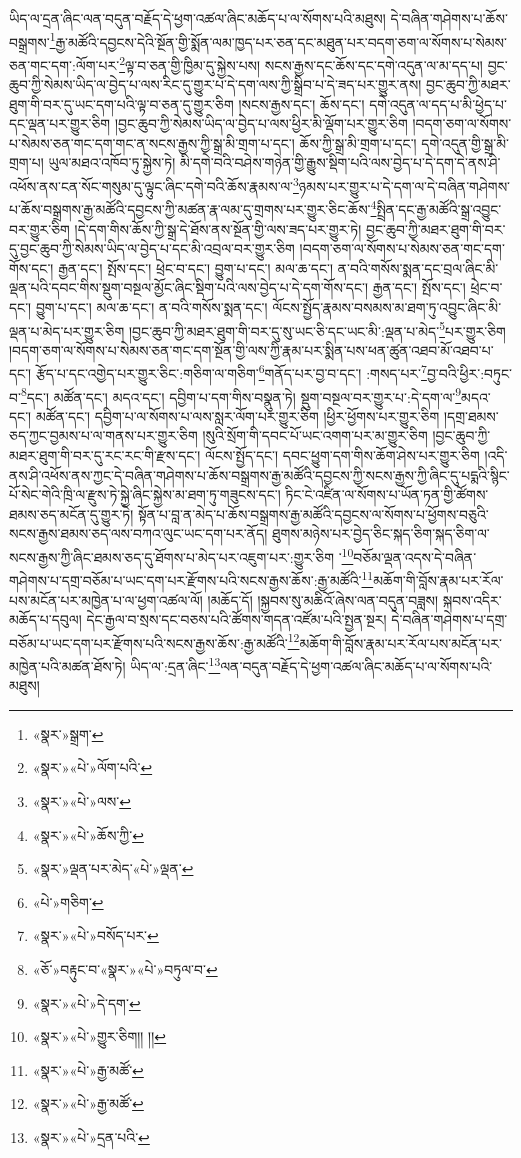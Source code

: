 ཡིད་ལ་དྲན་ཞིང་ལན་བདུན་བརྗོད་དེ་ཕྱག་འཚལ་ཞིང་མཆོད་པ་ལ་སོགས་པའི་མཐུས། དེ་བཞིན་གཤེགས་པ་ཆོས་བསྒྲགས་\footnote{«སྣར་»སྒྲག་}རྒྱ་མཚོའི་དབྱངས་དེའི་སྔོན་གྱི་སྨོན་ལམ་ཁྱད་པར་ཅན་དང་མཐུན་པར་བདག་ཅག་ལ་སོགས་པ་སེམས་ཅན་གང་དག་:ལོག་པར་\footnote{«སྣར་»«པེ་»ལོག་པའི་}ལྟ་བ་ཅན་གྱི་ཁྱིམ་དུ་སྐྱེས་པས། སངས་རྒྱས་དང་ཆོས་དང་དགེ་འདུན་ལ་མ་དད་པ། བྱང་ཆུབ་ཀྱི་སེམས་ཡིད་ལ་བྱེད་པ་ལས་རིང་དུ་གྱུར་པ་དེ་དག་ལས་ཀྱི་སྒྲིབ་པ་དེ་ཟད་པར་གྱུར་ནས། བྱང་ཆུབ་ཀྱི་མཐར་ཐུག་གི་བར་དུ་ཡང་དག་པའི་ལྟ་བ་ཅན་དུ་གྱུར་ཅིག །སངས་རྒྱས་དང་། ཆོས་དང་། དགེ་འདུན་ལ་དད་པ་མི་ཕྱེད་པ་དང་ལྡན་པར་གྱུར་ཅིག །བྱང་ཆུབ་ཀྱི་སེམས་ཡིད་ལ་བྱེད་པ་ལས་ཕྱིར་མི་ལྡོག་པར་གྱུར་ཅིག །བདག་ཅག་ལ་སོགས་པ་སེམས་ཅན་གང་དག་གང་ན་སངས་རྒྱས་ཀྱི་སྒྲ་མི་གྲག་པ་དང་། ཆོས་ཀྱི་སྒྲ་མི་གྲག་པ་དང་། དགེ་འདུན་གྱི་སྒྲ་མི་གྲག་པ། ཡུལ་མཐའ་འཁོབ་ཏུ་སྐྱེས་ཏེ། མི་དགེ་བའི་བཤེས་གཉེན་གྱི་རྒྱུས་སྡིག་པའི་ལས་བྱེད་པ་དེ་དག་དེ་ནས་ཤི་འཕོས་ནས་ངན་སོང་གསུམ་དུ་ལྟུང་ཞིང་དགེ་བའི་ཆོས་རྣམས་ལ་\footnote{«སྣར་»«པེ་»ལས་}ཉམས་པར་གྱུར་པ་དེ་དག་ལ་དེ་བཞིན་གཤེགས་པ་ཆོས་བསྒྲགས་རྒྱ་མཚོའི་དབྱངས་ཀྱི་མཚན་རྣ་ལམ་དུ་གྲགས་པར་གྱུར་ཅིང་ཆོས་\footnote{«སྣར་»«པེ་»ཆོས་ཀྱི་}སྤྲིན་དང་རྒྱ་མཚོའི་སྒྲ་འབྱུང་བར་གྱུར་ཅིག །དེ་དག་གིས་ཆོས་ཀྱི་སྒྲ་དེ་ཐོས་ནས་སྔོན་གྱི་ལས་ཟད་པར་གྱུར་ཏེ། བྱང་ཆུབ་ཀྱི་མཐར་ཐུག་གི་བར་དུ་བྱང་ཆུབ་ཀྱི་སེམས་ཡིད་ལ་བྱེད་པ་དང་མི་འབྲལ་བར་གྱུར་ཅིག །བདག་ཅག་ལ་སོགས་པ་སེམས་ཅན་གང་དག་གོས་དང་། རྒྱན་དང་། སྤོས་དང་། ཕྲེང་བ་དང་། བྱུག་པ་དང་། མལ་ཆ་དང་། ན་བའི་གསོས་སྨན་དང་བྲལ་ཞིང་མི་ལྡན་པའི་དབང་གིས་སྡུག་བསྔལ་མྱོང་ཞིང་སྡིག་པའི་ལས་བྱེད་པ་དེ་དག་གོས་དང་། རྒྱན་དང་། སྤོས་དང་། ཕྲེང་བ་དང་། བྱུག་པ་དང་། མལ་ཆ་དང་། ན་བའི་གསོས་སྨན་དང་། ལོངས་སྤྱོད་རྣམས་བསམས་མ་ཐག་ཏུ་འབྱུང་ཞིང་མི་ལྡན་པ་མེད་པར་གྱུར་ཅིག །བྱང་ཆུབ་ཀྱི་མཐར་ཐུག་གི་བར་དུ་སུ་ཡང་ཅི་དང་ཡང་མི་:ལྡན་པ་མེད་\footnote{«སྣར་»ལྡན་པར་མེད་«པེ་»ལྡན་}པར་གྱུར་ཅིག །བདག་ཅག་ལ་སོགས་པ་སེམས་ཅན་གང་དག་སྔོན་གྱི་ལས་ཀྱི་རྣམ་པར་སྨིན་པས་ཕན་ཚུན་འཐབ་མོ་འཐབ་པ་དང་། རྩོད་པ་དང་འགྱེད་པར་གྱུར་ཅིང་:གཅིག་ལ་གཅིག་\footnote{«པེ་»གཅིག་}གནོད་པར་བྱ་བ་དང་། :གསད་པར་\footnote{«སྣར་»«པེ་»བསོད་པར་}བྱ་བའི་ཕྱིར་:བཏུང་བ་\footnote{«ཅོ་»བརྟུང་བ་«སྣར་»«པེ་»བཏུལ་བ་}དང་། མཚོན་དང་། མདའ་དང་། དབྱིག་པ་དག་གིས་བསྣུན་ཏེ། སྡུག་བསྔལ་བར་གྱུར་པ་:དེ་དག་ལ་\footnote{«སྣར་»«པེ་»དེ་དག་}མདའ་དང་། མཚོན་དང་། དབྱིག་པ་ལ་སོགས་པ་ལས་སླར་ལོག་པར་གྱུར་ཅིག །ཕྱིར་ཕྱོགས་པར་གྱུར་ཅིག །དགྲ་ཐམས་ཅད་ཀྱང་བྱམས་པ་ལ་གནས་པར་གྱུར་ཅིག །སུའི་སྲོག་གི་དབང་པོ་ཡང་འགག་པར་མ་གྱུར་ཅིག །བྱང་ཆུབ་ཀྱི་མཐར་ཐུག་གི་བར་དུ་རང་རང་གི་རྫས་དང་། ལོངས་སྤྱོད་དང་། དབང་ཕྱུག་དག་གིས་ཆོག་ཤེས་པར་གྱུར་ཅིག །འདི་ནས་ཤི་འཕོས་ནས་ཀྱང་དེ་བཞིན་གཤེགས་པ་ཆོས་བསྒྲགས་རྒྱ་མཚོའི་དབྱངས་ཀྱི་སངས་རྒྱས་ཀྱི་ཞིང་དུ་པདྨའི་སྙིང་པོ་སེང་གེའི་ཁྲི་ལ་རྫུས་ཏེ་སྐྱེ་ཞིང་སྐྱེས་མ་ཐག་ཏུ་གཟུངས་དང་། ཏིང་ངེ་འཛིན་ལ་སོགས་པ་ཡོན་ཏན་གྱི་ཚོགས་ཐམས་ཅད་མངོན་དུ་གྱུར་ཏེ། སྟོན་པ་བླ་ན་མེད་པ་ཆོས་བསྒྲགས་རྒྱ་མཚོའི་དབྱངས་ལ་སོགས་པ་ཕྱོགས་བཅུའི་སངས་རྒྱས་ཐམས་ཅད་ལས་བཀའ་ལུང་ཡང་དག་པར་ནོད། ཐུགས་མཉེས་པར་བྱེད་ཅིང་སྐད་ཅིག་སྐད་ཅིག་ལ་སངས་རྒྱས་ཀྱི་ཞིང་ཐམས་ཅད་དུ་ཐོགས་པ་མེད་པར་འཇུག་པར་:གྱུར་ཅིག ་\footnote{«སྣར་»«པེ་»གྱུར་ཅིག།། །།}བཅོམ་ལྡན་འདས་དེ་བཞིན་གཤེགས་པ་དགྲ་བཅོམ་པ་ཡང་དག་པར་རྫོགས་པའི་སངས་རྒྱས་ཆོས་:རྒྱ་མཚོའི་\footnote{«སྣར་»«པེ་»རྒྱ་མཚོ་}མཆོག་གི་བློས་རྣམ་པར་རོལ་པས་མངོན་པར་མཁྱེན་པ་ལ་ཕྱག་འཚལ་ལོ། །མཆོད་དོ། །སྐྱབས་སུ་མཆིའོ་ཞེས་ལན་བདུན་བཟླས། སྐབས་འདིར་མཆོད་པ་དབུལ། དེང་རྒྱལ་བ་སྲས་དང་བཅས་པའི་ཚོགས་གདན་འཛོམ་པའི་སྤྱན་སྔར། དེ་བཞིན་གཤེགས་པ་དགྲ་བཅོམ་པ་ཡང་དག་པར་རྫོགས་པའི་སངས་རྒྱས་ཆོས་:རྒྱ་མཚོའི་\footnote{«སྣར་»«པེ་»རྒྱ་མཚོ་}མཆོག་གི་བློས་རྣམ་པར་རོལ་པས་མངོན་པར་མཁྱེན་པའི་མཚན་ཐོས་ཏེ། ཡིད་ལ་:དྲན་ཞིང་\footnote{«སྣར་»«པེ་»དྲན་པའི་}ལན་བདུན་བརྗོད་དེ་ཕྱག་འཚལ་ཞིང་མཆོད་པ་ལ་སོགས་པའི་མཐུས། 